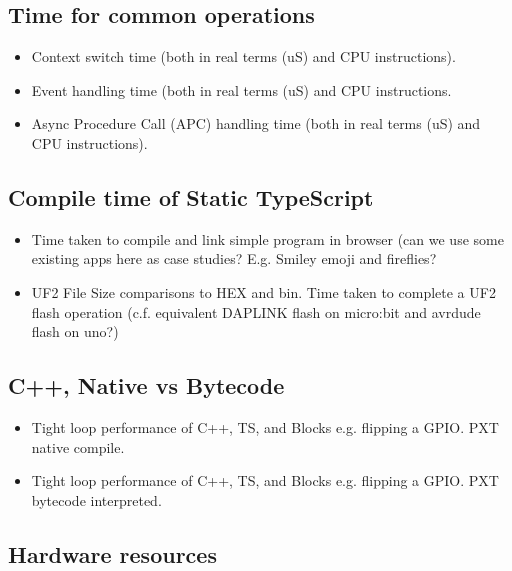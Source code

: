 \subsection{Time for common \CO operations}

\begin{itemize}
\item Context switch time (both in real terms (uS) and CPU instructions). 
\item Event handling time (both in real terms (uS) and CPU instructions. 
\item Async Procedure Call (APC) handling time (both in real terms (uS) and CPU instructions). 
\end{itemize}

\subsection{Compile time of Static TypeScript}

\begin{itemize}
\item Time taken to compile and link simple program in browser (can we use some existing apps 
      here as case studies? E.g. Smiley emoji and fireflies?
\item UF2 File Size comparisons to HEX and bin. Time taken to complete a UF2 flash operation 
    (c.f. equivalent DAPLINK flash on micro:bit and avrdude flash on uno?)
\end{itemize}

\subsection{C++, Native vs Bytecode}
\begin{itemize}
\item Tight loop performance of C++, TS, and Blocks e.g. flipping a GPIO. PXT native compile.
\item Tight loop performance of C++, TS, and Blocks e.g. flipping a GPIO. PXT bytecode interpreted.
\end{itemize}

\subsection{Hardware resources}


